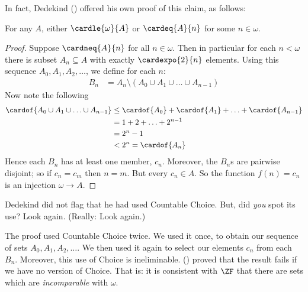 \documentclass[../../../include/open-logic-section]{subfiles}
\begin{document}
In fact, Dedekind (\citeyear{Dedekind1888}) offered his own proof of this claim, as follows:
\begin{thm} For any $A$, either $\cardle{\omega}{A}$ or $\cardeq{A}{n}$ for some $n \in \omega$.
\end{thm}
\begin{proof}
	Suppose $\cardneq{A}{n}$ for all $n \in \omega$. Then in particular for each $n < \omega$ there is subset $A_n \subseteq A$ with exactly $\cardexpo{2}{n}$ elements. Using this sequence $A_0, A_1, A_2, \ldots$, we define for each $n$:
	\begin{align*}
		B_n &= A_n \setminus (A_0 \cup A_1 \cup \ldots \cup A_{n-1})
	\end{align*}
	Now note the following
	\begin{align*}
	\cardof{A_0 \cup A_1  \cup \ldots \cup A_{n-1}} &\leq \cardof{A_0} + \cardof{A_1} + \ldots + \cardof{A_{n-1}}\\
	&=1 + 2 + \ldots + 2^{n-1}\\
	& = 2^n - 1\\
	& < 2^n = \cardof{A_n}
	\end{align*}
	Hence each $B_n$ has at least one member, $c_n$. Moreover, the $B_n$s are pairwise disjoint; so if $c_n = c_m$ then $n = m$. But every $c_n \in A$. So the function  $f(n) = c_n$ is an injection $\omega \to A$.
\end{proof}\noindent
Dedekind did not flag that he had used Countable Choice. But, did \emph{you} spot its use? Look again. (Really: Look again.)

The proof used Countable Choice twice. We used it {once}, to obtain our sequence of sets $A_0, A_1, A_2, \ldots$. We then used it again to select our elements $c_n$ from each $B_n$. Moreover, this use of Choice is ineliminable. \citeauthor{Cohen1966} (\citeyear[138]{Cohen1966}) proved that the result fails if we have no version of Choice. That is: it is consistent with $\ZF$ that there are sets which are \emph{incomparable} with $\omega$.
\end{document}
